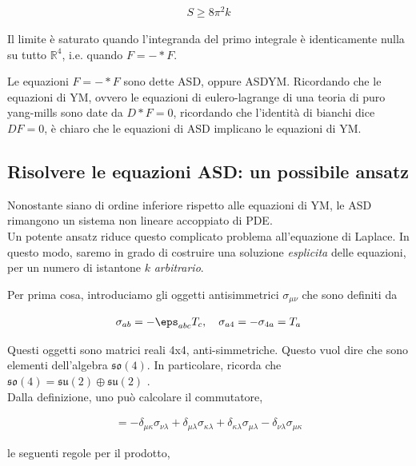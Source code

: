 \documentclass{report}
\begin{document}
\begin{align}
    S \geq 8\pi^2 k
\end{align}

Il limite è saturato quando l'integranda del primo integrale è identicamente nulla su tutto \(\mathbb{R}^4\), i.e. quando \(F = -*F\). 

Le equazioni \(F = -*F\) sono dette ASD, oppure ASDYM. Ricordando che le equazioni di YM, ovvero le equazioni di eulero-lagrange di una teoria di puro yang-mills sono date da \(D*F = 0\), ricordando che l'identità di bianchi dice \(DF =0\), è chiaro che le equazioni di ASD implicano le equazioni di YM. 

\subsection{Risolvere le equazioni ASD: un possibile ansatz}

Nonostante siano di ordine inferiore rispetto alle equazioni di YM, le ASD rimangono un sistema non lineare accoppiato di PDE. \\

Un potente ansatz riduce questo complicato problema all'equazione di Laplace. In questo modo, saremo in grado di costruire una soluzione \emph{esplicita} delle equazioni, per un numero di istantone \(k\) \emph{arbitrario}. 

Per prima cosa, introduciamo gli oggetti antisimmetrici \(\sigma_{\mu\nu}\) che sono definiti da 

\begin{align}
    \sigma_{ab} = -\eps_{abc}T_c, \quad \sigma_{a4} = -\sigma_{4a} = T_a
\end{align}

Questi oggetti sono matrici reali 4x4, anti-simmetriche. Questo vuol dire che sono elementi dell'algebra \(\mathfrak{so}(4)\). In particolare, ricorda che \(\mathfrak{so}(4) = \mathfrak{su}(2) \oplus \mathfrak{su}(2)\) . \\

Dalla definizione, uno può calcolare il commutatore,

\begin{align}
    [\sigma_{\mu\kappa}, \sigma_{\nu\lambda}] = -\delta_{\mu\kappa}\sigma_{\nu\lambda} + \delta_{\mu\lambda}\sigma_{\kappa\lambda} + \delta_{\kappa\lambda}\sigma_{\mu\lambda} - \delta_{\nu\lambda}\sigma_{\mu\kappa}
\end{align}

le seguenti regole per il prodotto, 
\end{document}
